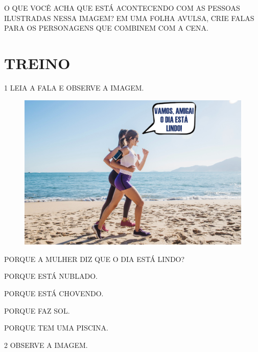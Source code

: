 O QUE VOCÊ ACHA QUE ESTÁ ACONTECENDO COM AS PESSOAS ILUSTRADAS NESSA IMAGEM? EM UMA FOLHA AVULSA, CRIE FALAS PARA OS PERSONAGENS QUE COMBINEM COM A CENA.


\section*{TREINO}


\num{1} LEIA A FALA E OBSERVE A IMAGEM.

\begin{figure}[H]
\centering
\includegraphics[width=.8\textwidth]{media/image175a.jpg}
\end{figure}

PORQUE A MULHER DIZ QUE O DIA ESTÁ LINDO? 

\begin{multicols}{2}
\begin{escolha}[itemsep=-5pt]
\item PORQUE ESTÁ NUBLADO.

\item PORQUE ESTÁ CHOVENDO.

\item PORQUE FAZ SOL.

\item  PORQUE TEM UMA PISCINA.
\end{escolha}
\end{multicols}

\num{2} OBSERVE A IMAGEM.

